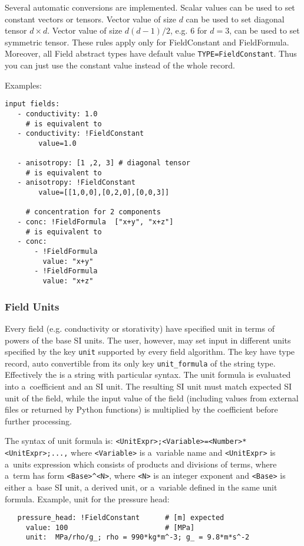 Several automatic conversions are implemented. Scalar values can be used to set constant vectors or tensors. Vector value of size $d$ can be used to set diagonal tensor $d\times d$.
Vector value of size $d(d-1)/2$, e.g. $6$ for $d=3$, can be used to set symmetric tensor. These rules apply only for FieldConstant and FieldFormula.
Moreover, all Field abstract types have default value \verb'TYPE=FieldConstant'. Thus you can just use the constant value instead of the whole record.

Examples:
\begin{verbatim}
input fields:
   - conductivity: 1.0
     # is equivalent to
   - conductivity: !FieldConstant
        value=1.0
   
   - anisotropy: [1 ,2, 3] # diagonal tensor
     # is equivalent to
   - anisotropy: !FieldConstant
        value=[[1,0,0],[0,2,0],[0,0,3]]

     # concentration for 2 components   
   - conc: !FieldFormula  ["x+y", "x+z"]
     # is equivalent to
   - conc: 
       - !FieldFormula
         value: "x+y"
       - !FieldFormula
         value: "x+z"
\end{verbatim}

\subsubsection{Field Units}
Every field (e.g. conductivity or storativity) have specified unit in terms of powers of the base SI units. 
The user, however, may set input in different units specified by the key \verb'unit' 
supported by every field algorithm. The key have type  record, auto convertible from its only key 
\verb'unit_formula' of the string type. Effectively the  is a string with particular syntax. 
The unit formula is evaluated  into a~coefficient and an SI unit. The resulting SI unit 
must match expected SI unit of the field, while the input value 
of the field (including values from external files or returned by Python functions)  
is multiplied by the coefficient before further processing.

The syntax of unit formula is: {\tt <UnitExpr>;<Variable>=<Number>*<UnitExpr>;...,}
where {\tt <Variable>} is a~variable name and {\tt <UnitExpr>} is a~units expression
which consists of products and divisions of terms, where a~term has form \verb'<Base>^<N>', 
where {\tt <N>} is an integer exponent and {\tt <Base>} is either a~base SI unit, 
a derived unit, or a~variable defined in the same unit formula.
Example, unit for the pressure head: 
\begin{verbatim}
   pressure_head: !FieldConstant      # [m] expected
     value: 100                       # [MPa] 
     unit:  MPa/rho/g_; rho = 990*kg*m^-3; g_ = 9.8*m*s^-2     
\end{verbatim}

